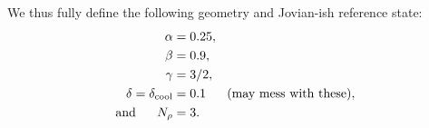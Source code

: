 \documentclass[12pt]{article}
\numberwithin{equation}{section}
\newcommand{\dcool}{\delta_{\rm{cool}}}
\begin{document}
We thus fully define the following geometry and Jovian-ish reference state:
\begin{subequations}
	\begin{align}
		\alpha &= 0.25,\\
		\beta &= 0.9,\\
		\gamma &= 3/2,\\
		\delta=\dcool &= 0.1\five \text{(may mess with these)},\\
		\andd N_\rho &= 3.
	\end{align}
\end{subequations}
\clearpage
\newpage
%
	
\end{document}
